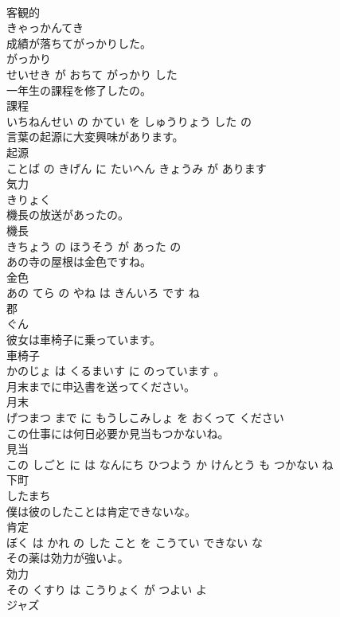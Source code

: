 \documentclass[8pt]{extreport}
\begin{document}
\begin{CJK}{UTF8}{min}
\\	客観的	
\\	きゃっかんてき			
\\	成績が落ちてがっかりした。	
\\	がっかり 
\\	せいせき が おちて がっかり した			
\\	一年生の課程を修了したの。	
\\	課程 
\\	いちねんせい の かてい を しゅうりょう した の			
\\	言葉の起源に大変興味があります。	
\\	起源 
\\	ことば の きげん に たいへん きょうみ が あります			
\\	気力	
\\	きりょく			
\\	機長の放送があったの。	
\\	機長 
\\	きちょう の ほうそう が あった の			
\\	あの寺の屋根は金色ですね。	
\\	金色 
\\	あの てら の やね は きんいろ です ね			
\\	郡	
\\	ぐん			
\\	彼女は車椅子に乗っています。	
\\	車椅子 
\\	かのじょ は くるまいす に のっています 。			
\\	月末までに申込書を送ってください。	
\\	月末 
\\	げつまつ まで に もうしこみしょ を おくって ください			
\\	この仕事には何日必要か見当もつかないね。	
\\	見当 
\\	この しごと に は なんにち ひつよう か けんとう も つかない ね			
\\	下町	
\\	したまち			
\\	僕は彼のしたことは肯定できないな。	
\\	肯定 
\\	ぼく は かれ の した こと を こうてい できない な			
\\	その薬は効力が強いよ。	
\\	効力 
\\	その くすり は こうりょく が つよい よ			
\\	ジャズ	

\end{CJK}
\end{document}
